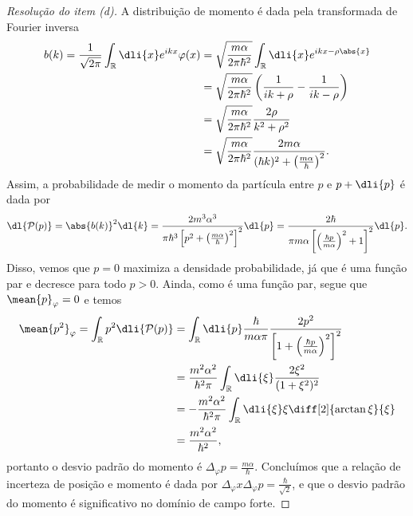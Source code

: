 \begin{proof}[Resolução do item (d)]
    A distribuição de momento é dada pela transformada de Fourier inversa
    \begin{align*}
        b(k) = \frac{1}{\sqrt{2\pi}} \int_{\mathbb{R}} \dli{x} e^{i k x} \varphi(x)
        &= \sqrt{\frac{m \alpha}{2\pi \hbar^2}}\int_{\mathbb{R}} \dli{x} e^{ikx - \rho\abs{x}}\\
        &= \sqrt{\frac{m \alpha}{2\pi \hbar^2}} \left(\frac{1}{ik + \rho} - \frac{1}{ik - \rho}\right)\\
        &= \sqrt{\frac{m \alpha}{2\pi \hbar^2}}\frac{2\rho}{k^2 + \rho^2}\\
        &= \sqrt{\frac{m \alpha}{2\pi \hbar^2}} \frac{2m \alpha}{(\hbar k)^2 + \left(\frac{m \alpha}{\hbar}\right)^2}.
    \end{align*}
    Assim, a probabilidade de medir o momento da partícula entre \(p\) e \(p + \dli{p}\) é dada por
    \begin{equation*}
        \dl{\mathcal{P}(p)} = \abs{b(k)}^2\dl{k} = \frac{2m^3 \alpha^3}{\pi \hbar^3\left[p^2 + \left(\frac{m \alpha}{\hbar}\right)^2\right]^2} \dl{p} = \frac{2 \hbar}{\pi m \alpha \left[\left(\frac{\hbar p}{m \alpha}\right)^2 + 1\right]^2}\dl{p}.
    \end{equation*}
    Disso, vemos que \(p = 0\) maximiza a densidade probabilidade, já que é uma função par e decresce para todo \(p > 0\). Ainda, como é uma função par, segue que \(\mean{p}_{\varphi} = 0\) e temos
    \begin{align*}
        \mean{p^2}_{\varphi} = \int_{\mathbb{R}} p^2 \dli{\mathcal{P}(p)}
        &= \int_{\mathbb{R}} \dli{p} \frac{\hbar}{m \alpha \pi} \frac{2p^2}{\left[1 + \left(\frac{\hbar p}{m \alpha}\right)^2\right]^2}\\
        &= \frac{m^2 \alpha^2}{\hbar^2\pi} \int_{\mathbb{R}} \dli{\xi} \frac{2\xi^2}{(1 + \xi^2)^2}\\
        &= -\frac{m^2 \alpha^2}{\hbar^2 \pi} \int_{\mathbb{R}} \dli{\xi}\xi \diff[2]{\arctan\xi}{\xi}\\
        &= \frac{m^2 \alpha^2}{\hbar^2},
    \end{align*}
    portanto o desvio padrão do momento é \(\Delta_\varphi p = \frac{m \alpha}{\hbar}\). Concluímos que a relação de incerteza de posição e momento é dada por \(\Delta_\varphi x \Delta_\varphi p = \frac{\hbar}{\sqrt{2}}\), e que o desvio padrão do momento é significativo no domínio de campo forte.
\end{proof}

